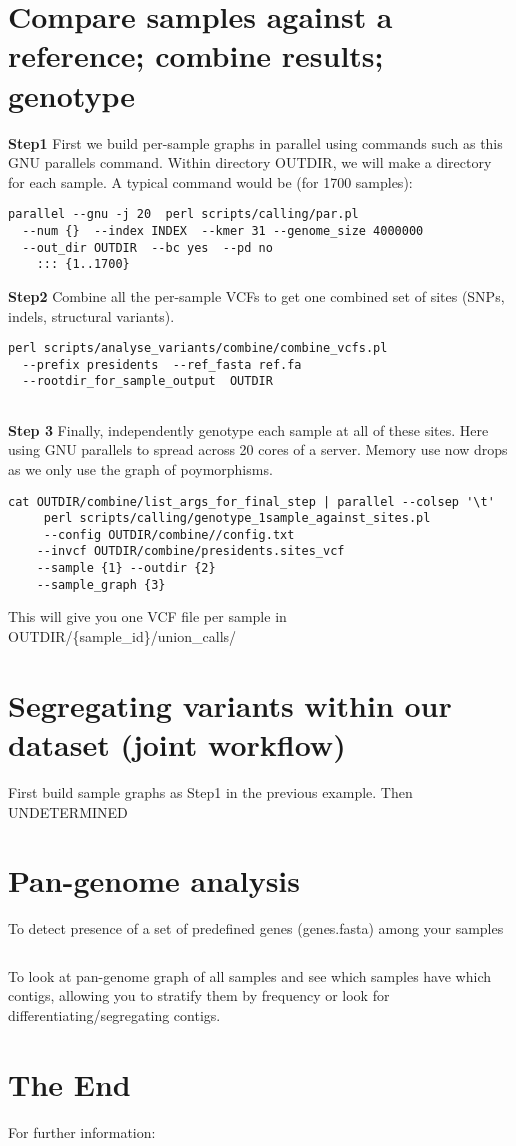 \documentclass[a4paper,9pt]{extarticle}
\begin{document}
\begin{multicols*}{2}
\section{Compare samples against a reference; combine results; genotype}

{\bf Step1 }First we build per-sample graphs in parallel using commands such as this GNU parallels command. Within directory OUTDIR, we will make a directory for each sample. A typical command would be (for 1700 samples):
\begin{verbatim}
parallel --gnu -j 20  perl scripts/calling/par.pl 
  --num {}  --index INDEX  --kmer 31 --genome_size 4000000 
  --out_dir OUTDIR  --bc yes  --pd no 
    ::: {1..1700}
\end{verbatim}
{\bf Step2} Combine all the per-sample VCFs to get one combined set of sites (SNPs, indels, structural variants). 

\begin{verbatim}
perl scripts/analyse_variants/combine/combine_vcfs.pl 
  --prefix presidents  --ref_fasta ref.fa 
  --rootdir_for_sample_output  OUTDIR
   
\end{verbatim}
{\bf Step 3} Finally, independently genotype each sample at all of these sites. Here using GNU parallels to spread across 20 cores of a server. Memory use now drops as we only use the graph of poymorphisms.
\begin{verbatim}
cat OUTDIR/combine/list_args_for_final_step | parallel --colsep '\t' 
     perl scripts/calling/genotype_1sample_against_sites.pl 
	 --config OUTDIR/combine//config.txt 
 	--invcf OUTDIR/combine/presidents.sites_vcf 
	--sample {1} --outdir {2} 
 	--sample_graph {3} 
\end{verbatim}
This will give you one VCF file per sample in OUTDIR/\{sample\_id\}/union\_calls/

\section{Segregating variants within our dataset (joint workflow)}
First build sample graphs as Step1 in the previous example. Then UNDETERMINED



\section{Pan-genome analysis}

To detect presence of a set of predefined genes (genes.fasta) among your samples
\begin{verbatim}
\end{verbatim}
To look at pan-genome graph of all samples and see which samples have which contigs, allowing you to stratify them by frequency or look for differentiating/segregating contigs.


\section{The End}

For further information:


\end{multicols*}
\end{document}
